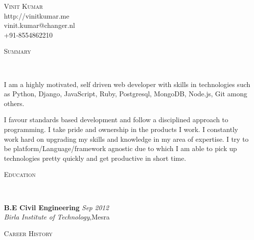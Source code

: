\documentclass[9pt]{article}
\newenvironment{changemargin}[2]{%
  \begin{list}{}{%
    \setlength{\topsep}{0pt}%
    \setlength{\leftmargin}{#1}%
    \setlength{\rightmargin}{#2}%
    \setlength{\listparindent}{\parindent}%
    \setlength{\itemindent}{\parindent}%
    \setlength{\parsep}{\parskip}%
  }%
  \item[]}{\end{list}
}
\newcommand{\lineover}{
	\begin{changemargin}{-0.05in}{-0.05in}
		\vspace*{-8pt}
		\hrulefill \\
		\vspace*{-2pt}
	\end{changemargin}
}
\newcommand{\header}[1]{
	\begin{changemargin}{-0.5in}{-0.5in}
		\scshape{#1}\\
  	\lineover
	\end{changemargin}
}
\newcommand{\contact}[4]{
	\begin{changemargin}{-0.5in}{-0.5in}
		\begin{center}
			{\Large \scshape {#1}}\\ \smallskip
			{#2}\\ \smallskip 
			{#3}\\ \smallskip
			{#4}\smallskip
		\end{center}
	\end{changemargin}
}
\newenvironment{body} {
	\vspace*{-16pt}
	\begin{changemargin}{-0.25in}{-0.5in}
  }	
	{\end{changemargin}
}
\begin{document}
\contact{Vinit Kumar}{http://vinitkumar.me}{vinit.kumar@changer.nl}{+91-8554862210}


\header{Summary}

\begin{body}
	\vspace{14pt}
I am a highly motivated, self driven web developer with skills in technologies such as Python, Django, JavaScript, Ruby, Postgresql, MongoDB, Node.js, Git among others.

I favour standards based development and follow a disciplined approach to programming. I take pride and ownership in the products I work. I constantly work hard on upgrading my skills and knowledge in my area of expertise. I try to be platform/Language/framework agnostic due to which I am able to pick up technologies pretty quickly and get productive in short time. 

\end{body}

\smallskip


\header{Education}

\begin{body}
	\vspace{14pt}
	\textbf{B.E Civil Engineering }{} \hfill \emph{Sep 2012}{} \\
	\emph{Birla Institute of Technology},Mesra{} \\
\end{body}

\smallskip


\header{Career History}
\end{document}
